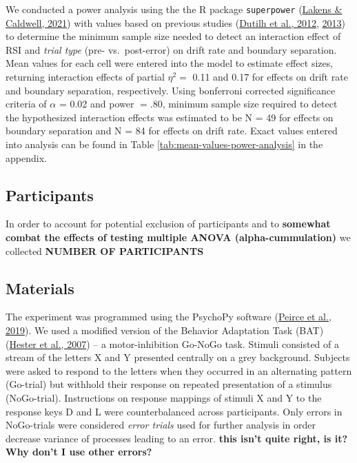 \documentclass[
  man,floatsintext]{apa7}
\begin{document}
We conducted a power analysis using the the R package \texttt{superpower} (\protect\hyperlink{ref-R-Superpower}{Lakens \& Caldwell, 2021}) with values based on previous studies (\protect\hyperlink{ref-dutilh2012testing}{Dutilh et al., 2012}, \protect\hyperlink{ref-dutilh2013}{2013}) to determine the minimum sample size needed to detect an interaction effect of RSI and \emph{trial type} (pre- vs.~post-error) on drift rate and boundary separation. Mean values for each cell were entered into the model to estimate effect sizes, returning interaction effects of partial \(\eta^2 =\) 0.11 and 0.17 for effects on drift rate and boundary separation, respectively. Using bonferroni corrected significance criteria of \(\alpha\) = 0.02 and power \(= .80\), minimum sample size required to detect the hypothesized interaction effects was estimated to be N = 49 for effects on boundary separation and N = 84 for effects on drift rate. Exact values entered into analysis can be found in Table \ref{tab:mean-values-power-analysis} in the appendix.

\hypertarget{participants}{%
\subsection{Participants}\label{participants}}

In order to account for potential exclusion of participants and to \textbf{somewhat combat the effects of testing multiple ANOVA (alpha-cummulation)} we collected \textbf{NUMBER OF PARTICIPANTS}

\hypertarget{materials}{%
\subsection{Materials}\label{materials}}

The experiment was programmed using the PsychoPy software (\protect\hyperlink{ref-peirce2019}{Peirce et al., 2019}). We used a modified version of the Behavior Adaptation Task (BAT) (\protect\hyperlink{ref-hester2007}{Hester et al., 2007}) -- a motor-inhibition Go-NoGo task. Stimuli consisted of a stream of the letters X and Y presented centrally on a grey background. Subjects were asked to respond to the letters when they occurred in an alternating pattern (Go-trial) but withhold their response on repeated presentation of a stimulus (NoGo-trial).
Instructions on response mappings of stimuli X and Y to the response keys D and L were counterbalanced across participants. Only errors in NoGo-trials were considered \emph{error trials} used for further analysis in order decrease variance of processes leading to an error. \textbf{this isn't quite right, is it? Why don't I use other errors?}
\end{document}
